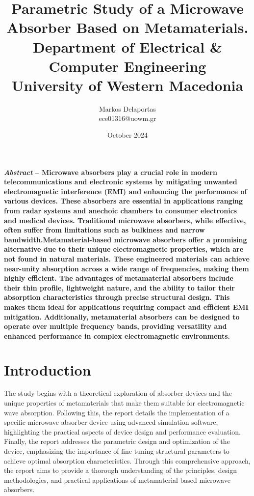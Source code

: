 \documentclass[12pt]{report}
\title{ \textsf{Parametric Study of a Microwave Absorber Based on Metamaterials.}\\
    \textsf{\Large Department of Electrical \& Computer Engineering}\\
    \textsf{\large University of Western Macedonia}
} \author{\textsf{Markos Delaportas} \\ ece01316@uowm.gr}
\date{\textsf{October 2024}}
\begin{document}
\maketitle

\textbf{ \textit{Abstract} -- Microwave absorbers play a crucial role in modern
    telecommunications and electronic systems by mitigating unwanted electromagnetic
    interference (EMI) and enhancing the performance of various devices. These absorbers are
    essential in applications ranging from radar systems and anechoic chambers to consumer
    electronics and medical devices. Traditional microwave absorbers, while effective, often
    suffer from limitations such as bulkiness and narrow bandwidth.Metamaterial-based
    microwave absorbers offer a promising alternative due to their unique electromagnetic
    properties, which are not found in natural materials. These engineered materials can
    achieve near-unity absorption across a wide range of frequencies, making them highly
    efficient. The advantages of metamaterial absorbers include their thin profile,
    lightweight nature, and the ability to tailor their absorption characteristics through
    precise structural design. This makes them ideal for applications requiring compact and
    efficient EMI mitigation. Additionally, metamaterial absorbers can be designed to operate
    over multiple frequency bands, providing versatility and enhanced performance in complex
    electromagnetic environments.}

{\let\clearpage\relax \tableofcontents} \thispagestyle{empty}    


\section{\textsf{Introduction}}
    The study begins with a theoretical exploration of absorber devices and the unique
    properties of metamaterials that make them suitable for electromagnetic wave absorption.
    Following this, the report details the implementation of a specific microwave absorber
    device using advanced simulation software, highlighting the practical aspects of device
    design and performance evaluation. Finally, the report addresses the parametric design and
    optimization of the device, emphasizing the importance of fine-tuning structural
    parameters to achieve optimal absorption characteristics. Through this comprehensive
    approach, the report aims to provide a thorough understanding of the principles, design
    methodologies, and practical applications of metamaterial-based microwave absorbers.




\end{document}
